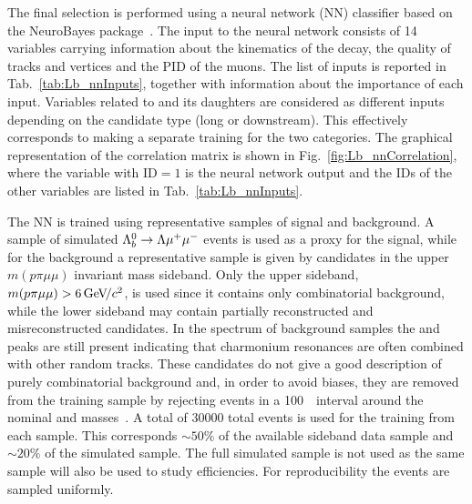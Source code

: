 The final selection is performed using a neural network (NN) classifier based on the NeuroBayes 
package~\cite{Feindt:2006pm,feindt-2004}. The input to the neural network consists of 14 variables carrying 
information about the kinematics of the decay, the quality of tracks and vertices and the PID of the muons.
The list of inputs is reported in Tab.~\ref{tab:Lb_nnInputs}, together with information 
about the importance of each input.
%
%
%
Variables related to \Lz and its daughters are considered as different inputs depending on the
candidate type (long or downstream). This effectively corresponds to making a separate
training for the two categories. 
The graphical representation of the correlation matrix is shown in Fig.~\ref{fig:Lb_nnCorrelation},
where the variable with ID$ = 1$ is the neural network output and the IDs of the other variables are 
listed in Tab.~\ref{tab:Lb_nnInputs}.

The NN is trained using representative samples of signal and background.  A sample of simulated 
${{\Lambda}^0_{b}}\rightarrow{\ensuremath{\Lambda}}{\ensuremath{\mu^+\mu^-}}$ events is used as a proxy for the signal, while for the background a representative sample
is given by candidates in the upper $m(p\pi\mu\mu)$ invariant mass sideband. Only the upper sideband,
$m(p\pi\mu\mu) > 6 \gevcc$, is used since it contains only combinatorial background,
while the lower sideband may contain partially reconstructed and misreconstructed candidates.
In the \qsq spectrum of background samples the \jpsi and \psitwos peaks are still present indicating that charmonium
resonances are often combined with other random tracks. These candidates do not give a good description of purely
combinatorial background and, in order to avoid biases, they are removed from the training
sample by rejecting events in a 100~\mevcc~interval around the nominal \jpsi and \psitwos masses~\cite{PDG2014}.
A total of 30000 total events is used for the training from each sample. This corresponds $\sim 50\%$ of the available
sideband data sample and $\sim 20\%$ of the simulated sample. The full simulated sample is not used
as the same sample will also be used to study efficiencies. For reproducibility the events are sampled uniformly.

